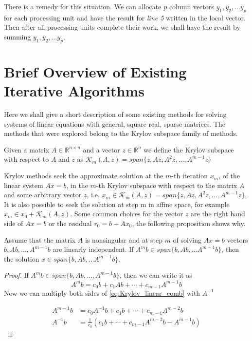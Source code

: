 There is a remedy for this situation. We can allocate $p$ column vectors $y_1, y_2, \dots y_p$ for each processing unit and have the result for \textit{line 5} written in the local vector. Then after all processing units complete their work, we shall have the result by summing $y_1, y_2, \dots y_p$.

\section{Brief Overview of Existing Iterative Algorithms}
Here we shall give a short description of some existing methods for solving systems of linear equations with general, square real, sparse matrices. The methods that were explored belong to the Krylov subspace family of methods.

\begin{definition}
Given a matrix $A \in \mathbb{R}^{n \times n}$ and a vector $z \in \mathbb{R}^n$ we define the Krylov subspace with respect to $A$ and $z$ as $\mathcal{K}_m(A, z) = span\{z, Az,A^2z, \dots, A^{m-1}z\}$
\end{definition}

Krylov methods seek the approximate solution at the $m$-th iteration $x_m$, of the linear system $Ax = b$, in the $m$-th Krylov subspace with respect to the matrix $A$ and some arbitrary vector $z$, i.e. $x_m \in \mathcal{K}_m(A, z) = span\{z, Az,A^2z, \dots, A^{m-1}z\}$. It is also possible to seek the solution at step m in affine space, for example $x_m \in x_0 + \mathcal{K}_m(A, z)$. Some common choices for the vector $z$ are the right hand side of $Ax = b$ or the residual $r_0 = b - Ax_0$, the following proposition shows why.

\begin{proposition}Assume that the matrix $A$ is nonsingular and at step $m$ of solving $Ax = b$ vectors $b, Ab, \dots, A^{m-1}b$ are linearly independent. If $A^{m}b \in span\{b, Ab, \dots A^{m-1}b\}$, then the solution $x \in span\{b, Ab, \dots A^{m-1}b\}$.
\end{proposition}

\begin{proof}
If $A^{m}b \in span\{b, Ab, \dots, A^{m-1}b\}$, then we can write it as
\begin{equation}\label{eq:Krylov_linear_comb}
	A^{m}b = c_0b + c_1Ab + \cdots + c_{m-1}A^{m-1}b
\end{equation}
Now we can multiply both sides of \cref{eq:Krylov_linear_comb} with $A^{-1}$

\begin{align*}
	A^{m - 1}b &= c_0A^{-1}b + c_1b + \cdots + c_{m-1}A^{m-2}b \\
	A^{-1}b &= \frac{1}{c_0}(c_1b + \cdots + c_{m-1}A^{m-2}b - A^{m - 1}b)
\end{align*}

\end{proof}

